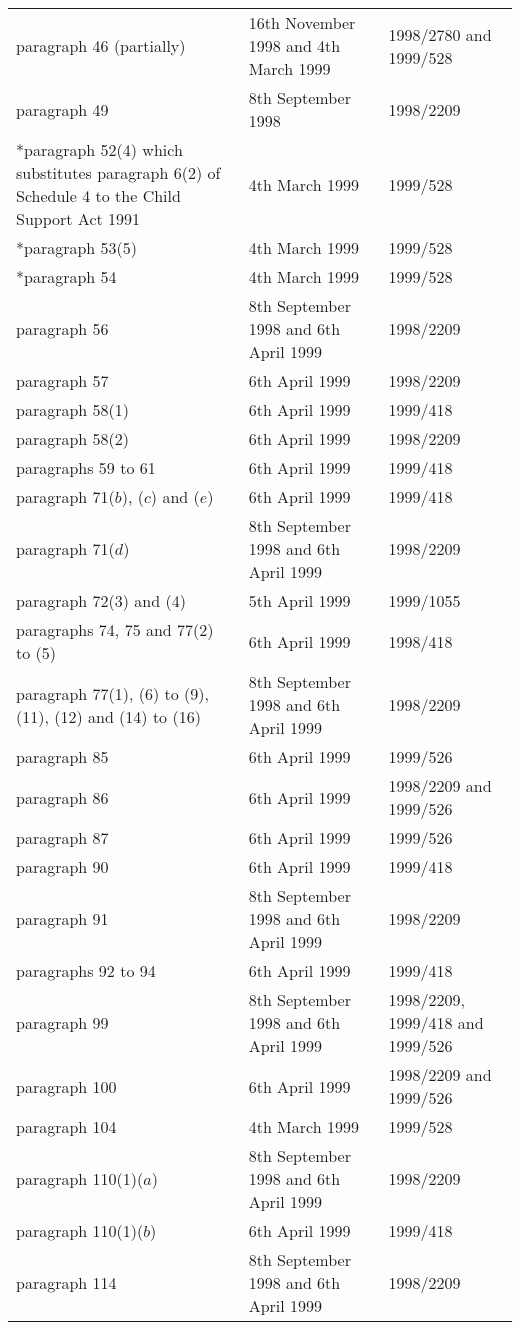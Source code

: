 \documentclass[12pt,a4paper]{article}
\begin{document}
{\begin{longtable}{p{193.78079pt}p{78.37471pt}p{81.83215pt}}
paragraph 46 (partially)	&16th November 1998 and 4th March 1999	&1998/2780 and 1999/528\\
paragraph 49	&8th September 1998	&1998/2209\\
{}*paragraph 52(4) which substitutes paragraph 6(2) of Schedule 4 to the Child Support Act 1991	&4th March 1999	&1999/528\\
{}*paragraph 53(5)	&4th March 1999	&1999/528\\
{}*paragraph 54	&4th March 1999	&1999/528\\
paragraph 56	&8th September 1998 and 6th April 1999	&1998/2209\\
paragraph 57	&6th April 1999	&1998/2209\\
paragraph 58(1)	&6th April 1999	&1999/418\\
paragraph 58(2)	&6th April 1999	&1998/2209\\
paragraphs 59 to 61	&6th April 1999	&1999/418\\
paragraph 71($b$), ($c$) and ($e$)	&6th April 1999	&1999/418\\
paragraph 71($d$)	&8th September 1998 and 6th April 1999	&1998/2209\\
paragraph 72(3) and (4)	&5th April 1999	&1999/1055\\
paragraphs 74, 75 and 77(2) to (5)	&6th April 1999	&1998/418\\
paragraph 77(1), (6) to (9), (11), (12) and (14) to (16)	&8th September 1998 and 6th April 1999	&1998/2209\\
paragraph 85	&6th April 1999	&1999/526\\
paragraph 86	&6th April 1999	&1998/2209 and 1999/526\\
paragraph 87	&6th April 1999	&1999/526\\
paragraph 90	&6th April 1999	&1999/418\\
paragraph 91	&8th September 1998 and 6th April 1999	&1998/2209\\
paragraphs 92 to 94	&6th April 1999	&1999/418\\
paragraph 99	&8th September 1998 and 6th April 1999	&1998/2209, 1999/418 and 1999/526\\
paragraph 100	&6th April 1999	&1998/2209 and 1999/526\\
paragraph 104	&4th March 1999	&1999/528\\
paragraph 110(1)($a$)	&8th September 1998 and 6th April 1999	&1998/2209\\
paragraph 110(1)($b$)	&6th April 1999	&1999/418\\
paragraph 114	&8th September 1998 and 6th April 1999	&1998/2209\\

\end{longtable}}
\end{document}
